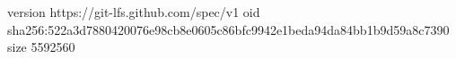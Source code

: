 version https://git-lfs.github.com/spec/v1
oid sha256:522a3d7880420076e98cb8e0605c86bfc9942e1beda94da84bb1b9d59a8c7390
size 5592560
